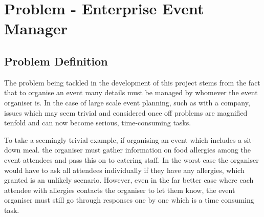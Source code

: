 \chapter{Problem - Enterprise Event Manager}
\label{chap:problem}


\section{Problem Definition}
\label{section:problemdefinition}



The problem being tackled in the development of this project stems from the fact that to organise an event many details must be managed by whomever the event organiser is. In the case of large scale event planning, such as with a company, issues which may seem trivial and considered once off problems are magnified tenfold and can now become serious, time-consuming tasks.

To take a seemingly trivial example, if organising an event which includes a sit-down meal. the organiser must gather information on food allergies among the event attendees and pass this on to catering staff. In the worst case the organiser would have to ask all attendees individually if they have any allergies, which granted is an unlikely scenario. However, even in the far better case where each attendee with allergies contacts the organiser to let them know, the event organiser must still go through responses one by one which is a time consuming task.

